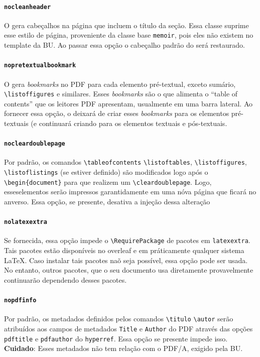 \documentclass[embeddedlogo]{ufsc-thesis-rn46-2019}
\newcommand{\lacmd}[1]{\texttt{\textbackslash{}#1}}
\begin{document}
\paragraph*{\texttt{nocleanheader}} O \abnTeX{} gera cabeçalhos na página que
incluem o título da seção. Essa classe suprime esse estilo de página,
proveniente da classe base \texttt{memoir}, pois eles não existem no template
da BU. Ao passar essa opção o cabeçalho padrão do \abnTeX{} será restaurado.

\paragraph*{\texttt{nopretextualbookmark}} O \abnTeX{} gera \emph{bookmarks} no
PDF para cada elemento pré-textual, exceto sumário, \lacmd{listoffigures} e
similares. Esses \emph{bookmarks} são o que alimenta o ``table of contents'' que
os leitores PDF apresentam, usualmente em uma barra lateral.  Ao fornecer essa
opção, o \abnTeX{} deixará de criar esses \emph{bookmarks} para os elementos
pré-textuais (e continuará criando para os elementos textuais e pós-textuais.

\paragraph*{\texttt{nocleardoublepage}} Por padrão, os comandos
\lacmd{tableofcontents} \lacmd{listoftables}, \lacmd{listoffigures},
\lacmd{listoflistings} (se estiver definido) são modificados logo após o
\lacmd{begin\{document\}} para que realizem um \lacmd{cleardoublepage}. Logo,
esseselementos serão impressos garantidamente em uma nóva página que ficará no
anverso. Essa opção, se presente, desativa a injeção dessa alteração

\paragraph*{\texttt{nolatexextra}}
Se fornecida, essa opção impede o \lacmd{RequirePackage} de pacotes em \texttt{latexextra}.
Tais pacotes estão disponíveis no overleaf e em práticamente qualquer sistema
\LaTeX. Caso instalar tais pacotes naõ seja possível, essa opção pode ser usada.
No entanto, outros pacotes, que o seu documento usa diretamente provavelmente
continuarão dependendo desses pacotes.

\paragraph*{\texttt{nopdfinfo}} Por padrão, os metadados definidos pelos
comandos \lacmd{titulo} \lacmd{autor} serão atribuídos aos campos de metadados
\texttt{Title} e \texttt{Author} do PDF através das opções \texttt{pdftitle} e
\texttt{pdfauthor} do \texttt{hyperref}. Essa opção se presente impede isso.
\textbf{Cuidado}: Esses metadados não tem relação com o PDF/A, exigido pela BU.
\end{document}
